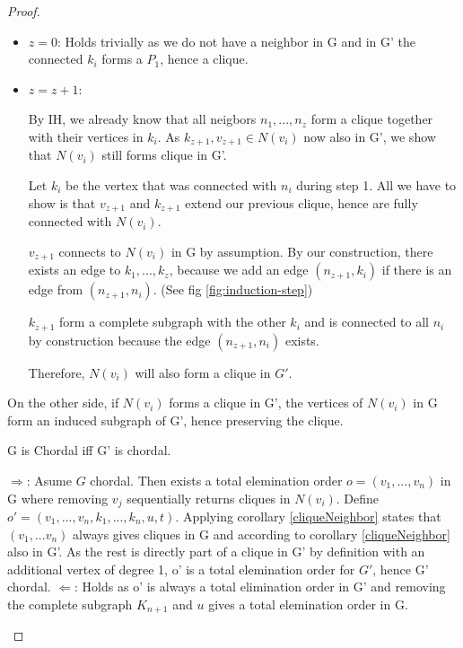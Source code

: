 \begin{proof}
\begin{subproof}
        \begin{itemize}
            \item $z = 0$: Holds trivially as we do not have a neighbor in G and in G' the connected $k_i$ forms a $P_1$, hence a clique.
            \item $z = z + 1$: 

            By IH, we already know that all neigbors $n_1,...,n_z$ form a clique together with their vertices in $k_{i}$. As $k_{z+1}, v_{z+1} \in N(v_i)$ now also in G', we show that $N(v_i)$ still forms clique in G'.

            Let $k_i$ be the vertex that was connected with $n_i$ during step 1. All we have to show is that $v_{z+1}$ and $k_{z+1}$ extend our previous clique, hence are fully connected with $N(v_i)$.
            
            $v_{z+1}$ connects to $N(v_i)$ in G by assumption. By our construction, there exists an edge to $k_1,...,k_z$, because we add an edge $(n_{z+1}, k_i)$ if there is an edge from $(n_{z+1}, n_i)$. (See fig \ref{fig:induction-step})

            $k_{z+1}$ form a complete subgraph with the other $k_i$ and is connected to all $n_i$ by construction because the edge $(n_{z+1},n_i)$ exists.  


            Therefore, $N(v_i)$ will also form a clique in $G'$.
        \end{itemize}

        On the other side, if $N(v_i)$ forms a clique in G', the vertices of $N(v_i)$ in G form an induced subgraph of G', hence preserving the clique.
        
    \end{subproof}
   
    \begin{corollary}
    G is Chordal iff G' is chordal.    
    \end{corollary}
    \begin{subproof}
    $\Rightarrow$: Asume $G$ chordal. Then exists a total elemination order $o = (v_1, ..., v_n)$ in G where removing $v_j$ sequentially returns cliques in $N(v_i)$.
    Define $o' = (v_1, ..., v_n, k_1, ..., k_n, u, t)$. Applying corollary \ref*{cliqueNeighbor} states that $(v_1, ... v_n)$ always gives cliques in G and according to corollary \ref*{cliqueNeighbor} also in G'. As the rest is directly part of a clique in G' by definition with an additional vertex of degree 1, o' is a total elemination order for $G'$, hence G' chordal.
    $\Leftarrow$: Holds as o' is always a total elimination order in G' and removing the complete subgraph $K_{n+1}$ and $u$ gives a total elemination order in G.
    \end{subproof}



\end{proof}
